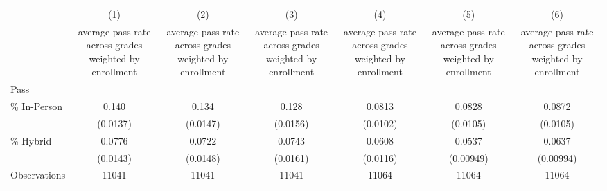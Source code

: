 \begin{tabular}{l*{6}{c}}
\hline\hline
                    &\multicolumn{1}{c}{(1)}&\multicolumn{1}{c}{(2)}&\multicolumn{1}{c}{(3)}&\multicolumn{1}{c}{(4)}&\multicolumn{1}{c}{(5)}&\multicolumn{1}{c}{(6)}\\
                    &\multicolumn{1}{c}{average pass rate across grades weighted by enrollment}&\multicolumn{1}{c}{average pass rate across grades weighted by enrollment}&\multicolumn{1}{c}{average pass rate across grades weighted by enrollment}&\multicolumn{1}{c}{average pass rate across grades weighted by enrollment}&\multicolumn{1}{c}{average pass rate across grades weighted by enrollment}&\multicolumn{1}{c}{average pass rate across grades weighted by enrollment}\\
Pass                &            &            &            &            &            &            \\
\hline
\% In-Person        &       0.140&       0.134&       0.128&      0.0813&      0.0828&      0.0872\\
                    &    (0.0137)&    (0.0147)&    (0.0156)&    (0.0102)&    (0.0105)&    (0.0105)\\
[1em]
\% Hybrid           &      0.0776&      0.0722&      0.0743&      0.0608&      0.0537&      0.0637\\
                    &    (0.0143)&    (0.0148)&    (0.0161)&    (0.0116)&   (0.00949)&   (0.00994)\\
\hline
Observations        &       11041&       11041&       11041&       11064&       11064&       11064\\
\hline\hline
\end{tabular}
